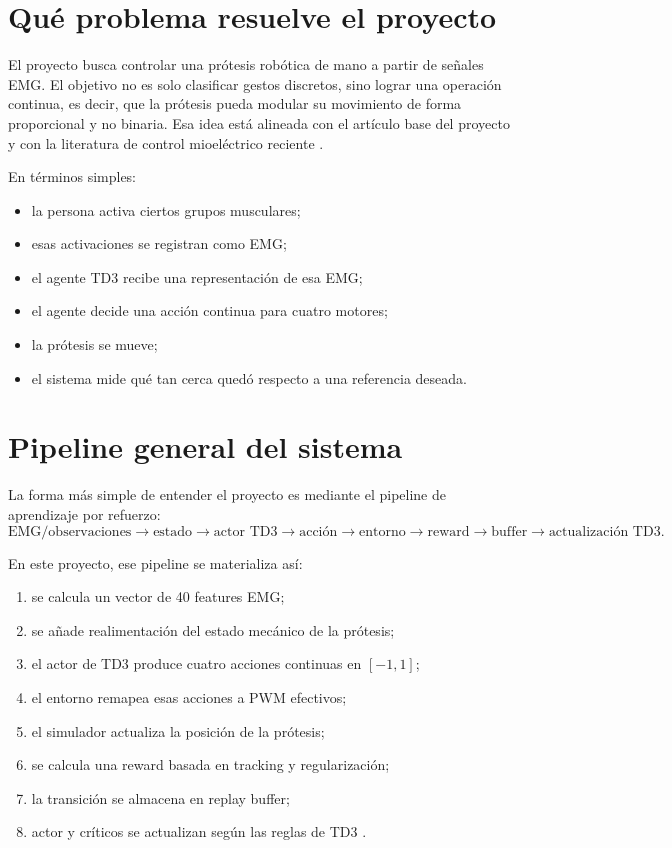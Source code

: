 \documentclass[11pt,a4paper]{article}
\begin{document}
\section{Qu\'e problema resuelve el proyecto}

El proyecto busca controlar una pr\'otesis rob\'otica de mano a partir de se\~nales EMG. El objetivo no es solo clasificar gestos discretos, sino lograr una operaci\'on continua, es decir, que la pr\'otesis pueda modular su movimiento de forma proporcional y no binaria. Esa idea est\'a alineada con el art\'iculo base del proyecto \citep{fuertes2026continuous} y con la literatura de control mioel\'ectrico reciente \citep{chen2023review}.

En t\'erminos simples:
\begin{itemize}[leftmargin=1.2cm]
    \item la persona activa ciertos grupos musculares;
    \item esas activaciones se registran como EMG;
    \item el agente TD3 recibe una representaci\'on de esa EMG;
    \item el agente decide una acci\'on continua para cuatro motores;
    \item la pr\'otesis se mueve;
    \item el sistema mide qu\'e tan cerca qued\'o respecto a una referencia deseada.
\end{itemize}

\section{Pipeline general del sistema}

La forma m\'as simple de entender el proyecto es mediante el pipeline de aprendizaje por refuerzo:
\begin{equation}
\text{EMG/observaciones}
\rightarrow
\text{estado}
\rightarrow
\text{actor TD3}
\rightarrow
\text{acci\'on}
\rightarrow
\text{entorno}
\rightarrow
\text{reward}
\rightarrow
\text{buffer}
\rightarrow
\text{actualizaci\'on TD3}.
\end{equation}

En este proyecto, ese pipeline se materializa as\'i:
\begin{enumerate}[leftmargin=1.2cm]
    \item se calcula un vector de 40 features EMG;
    \item se a\~nade realimentaci\'on del estado mec\'anico de la pr\'otesis;
    \item el actor de TD3 produce cuatro acciones continuas en \([-1,1]\);
    \item el entorno remapea esas acciones a PWM efectivos;
    \item el simulador actualiza la posici\'on de la pr\'otesis;
    \item se calcula una reward basada en tracking y regularizaci\'on;
    \item la transici\'on se almacena en replay buffer;
    \item actor y cr\'iticos se actualizan seg\'un las reglas de TD3 \citep{fujimoto2018td3,mathworks_td3_agent,mathworks_td3_options}.
\end{enumerate}
\end{document}
